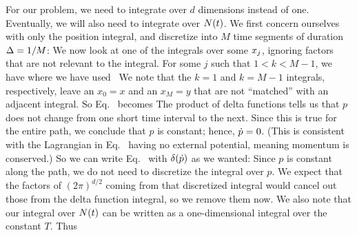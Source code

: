 \documentclass[11pt]{article}
\begin{document}
{	For our problem, we need to integrate over $d$ dimensions instead of one.  Eventually, we will also need to integrate over $N(t)$.  We first concern ourselves with only the position integral, and discretize into $M$ time segments of duration $\Delta = 1 / M$:
	We now look at one of the integrals over some $x_j$, ignoring factors that are not relevant to the integral.  For some $j$ such that $1 < k < M - 1$, we have
	where we have used~\cite{Delta}
	We note that the $k = 1$ and $k = M - 1$ integrals, respectively, leave an $x_0 = x$ and an $x_M = y$ that are not ``matched'' with an adjacent integral.  So Eq.~ becomes
	The product of delta functions tells us that $p$ does not change from one short time interval to the next.  Since this is true for the entire path, we conclude that $p$ is constant; hence, $\dot{p} = 0$.  (This is consistent with the Lagrangian in Eq.~ having no external potential, meaning momentum is conserved.)  So we can write Eq.~ with $\delta(\dot{p})$ as we wanted:
	Since $p$ is constant along the path, we do not need to discretize the integral over $p$.  We expect that the factors of $(2\pi)^{d / 2}$ coming from that discretized integral would cancel out those from the delta function integral, so we remove them now.  We also note that our integral over $N(t)$ can be written as a one-dimensional integral over the constant $T$.  Thus
	}
\end{document}
